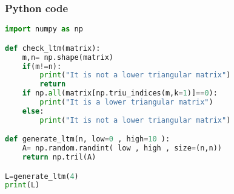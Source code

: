 \documentclass{beamer}
\begin{document}
\begin{frame}[fragile]
    \frametitle{Python code}
    \begin{lstlisting}[language=Python]
import numpy as np

def check_ltm(matrix):
    m,n= np.shape(matrix)
    if(m!=n):
        print("It is not a lower triangular matrix")
        return
    if np.all(matrix[np.triu_indices(m,k=1)]==0):
        print("It is a lower triangular matrix")
    else:
        print("It is not a lower triangular matrix")

def generate_ltm(n, low=0 , high=10 ):
    A= np.random.randint( low , high , size=(n,n))
    return np.tril(A)

L=generate_ltm(4)
print(L)
    \end{lstlisting}   
\end{frame}
\end{document}
